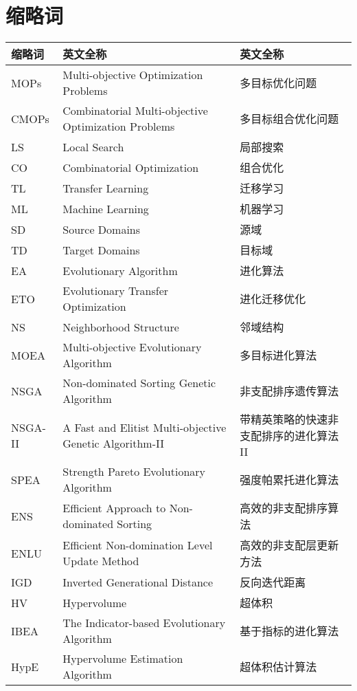 \chapter*{缩略词}
\label{chap:缩略词}
{
\noindent\begin{longtabu} to \textwidth {|X[1,c]|X[6,c]|X[3,c]|}\hline
缩略词 & 英文全称 & 英文全称 \\ \hline
MOPs & Multi-objective Optimization Problems & 多目标优化问题 \\ \hline
CMOPs & Combinatorial Multi-objective Optimization Problems & 多目标组合优化问题 \\ \hline
LS & Local Search & 局部搜索 \\ \hline
CO & Combinatorial Optimization & 组合优化 \\ \hline
TL & Transfer Learning & 迁移学习 \\ \hline
ML & Machine Learning & 机器学习 \\ \hline
SD & Source Domains & 源域 \\ \hline
TD & Target Domains & 目标域 \\ \hline
EA & Evolutionary Algorithm & 进化算法 \\ \hline
ETO & Evolutionary Transfer Optimization & 进化迁移优化 \\ \hline
NS & Neighborhood Structure & 邻域结构 \\ \hline
MOEA & Multi-objective Evolutionary Algorithm & 多目标进化算法 \\ \hline
NSGA & Non-dominated Sorting Genetic Algorithm  & 非支配排序遗传算法\\ \hline
NSGA-II & A Fast and Elitist Multi-objective Genetic Algorithm-II & 带精英策略的快速非支配排序的进化算法II \\ \hline
SPEA & Strength Pareto Evolutionary Algorithm & 强度帕累托进化算法 \\ \hline
ENS & Efficient Approach to Non-dominated Sorting & 高效的非支配排序算法 \\ \hline
ENLU & Efficient Non-domination Level Update Method & 高效的非支配层更新方法 \\ \hline
IGD & Inverted Generational Distance & 反向迭代距离 \\ \hline
HV & Hypervolume & 超体积 \\ \hline
IBEA & The Indicator-based Evolutionary Algorithm & 基于指标的进化算法 \\ \hline
HypE & Hypervolume Estimation Algorithm & 超体积估计算法 \\ \hline

\end{longtabu}}
